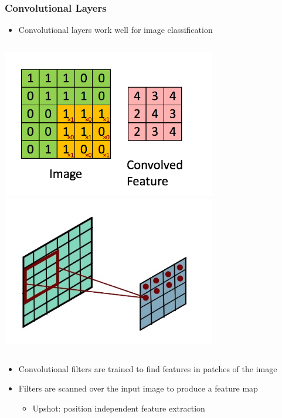 \documentclass[10pt,professionalfonts,xcolor=table]{beamer}
\begin{document}
\begin{frame}
\frametitle{Convolutional Layers}


  \begin{itemize}
  \item Convolutional layers work well for image classification
  \end{itemize}
  \begin{columns}[c]
  \centering \includegraphics[width=0.7\textwidth]{figures/figures/conv.png}
  \centering \includegraphics[width=0.7\textwidth]{figures/figures/conv3d.png}
  \end{columns}
  \begin{itemize}
  \gap
  \item Convolutional filters are trained to find features in patches of the image
  \gap
  \item Filters are scanned over the input image to produce a feature map
    \begin{itemize}
    \item Upshot: position independent feature extraction
    \end{itemize}
  \gap
  \end{itemize}

\end{frame}
\end{document}
